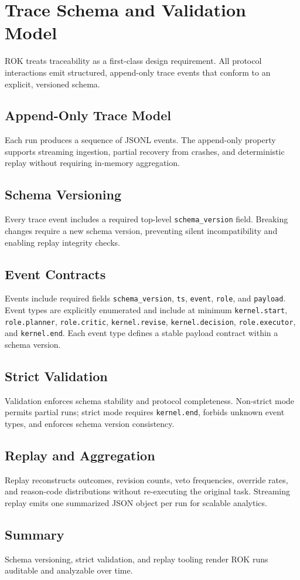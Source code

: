 \section{Trace Schema and Validation Model}

ROK treats traceability as a first-class design requirement. All protocol interactions emit structured, append-only trace events that conform to an explicit, versioned schema.

\subsection{Append-Only Trace Model}
Each run produces a sequence of JSONL events. The append-only property supports streaming ingestion, partial recovery from crashes, and deterministic replay without requiring in-memory aggregation.

\subsection{Schema Versioning}
Every trace event includes a required top-level \texttt{schema\_version} field. Breaking changes require a new schema version, preventing silent incompatibility and enabling replay integrity checks.

\subsection{Event Contracts}
Events include required fields \texttt{schema\_version}, \texttt{ts}, \texttt{event}, \texttt{role}, and \texttt{payload}. Event types are explicitly enumerated and include at minimum \texttt{kernel.start}, \texttt{role.planner}, \texttt{role.critic}, \texttt{kernel.revise}, \texttt{kernel.decision}, \texttt{role.executor}, and \texttt{kernel.end}. Each event type defines a stable payload contract within a schema version.

\subsection{Strict Validation}
Validation enforces schema stability and protocol completeness. Non-strict mode permits partial runs; strict mode requires \texttt{kernel.end}, forbids unknown event types, and enforces schema version consistency.

\subsection{Replay and Aggregation}
Replay reconstructs outcomes, revision counts, veto frequencies, override rates, and reason-code distributions without re-executing the original task. Streaming replay emits one summarized JSON object per run for scalable analytics.

\subsection{Summary}
Schema versioning, strict validation, and replay tooling render ROK runs auditable and analyzable over time.

